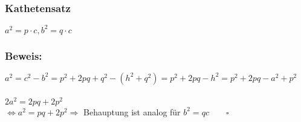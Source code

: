 \subsubsection{Kathetensatz}
$a^{2} = p\cdot c, b^{2} = q\cdot c$
%
%
%
\subsubsection{Beweis:}
$a^{2} = c^{2}-b^{2}=p^{2}+2pq+q^{2}-(h^{2}+q^{2})=p^{2}+2pq-h^{2}=p^{2}+2pq-a^{2}+p^{2}$\\
\qquad\\
$2a^{2}=2pq+2p^{2}$\\
$\Leftrightarrow a^{2} = pq+2p^{2} \Rightarrow$ Behauptung ist analog für $b^{2} = qc \qquad\square$